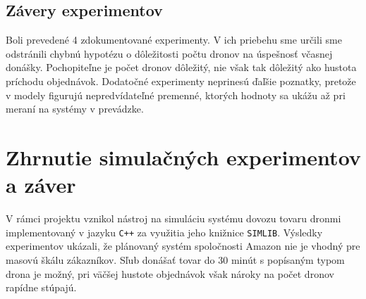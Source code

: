 \documentclass[czech, 12pt, a4paper]{article}
\begin{document}
\subsection{Závery experimentov}
Boli prevedené 4 zdokumentované experimenty. V ich priebehu sme určili sme odstránili chybnú hypotézu o dôležitosti počtu dronov na úspešnosť včasnej donášky. Pochopiteľne je počet dronov dôležitý, nie však tak dôležitý ako hustota príchodu objednávok. Dodatočné experimenty neprinesú ďaľšie poznatky, pretože v modely figurujú nepredvídateľné premenné, ktorých hodnoty sa ukážu až pri meraní na systémy v prevádzke.

\section{Zhrnutie simulačných experimentov a záver}
V rámci projektu vznikol nástroj na simuláciu systému dovozu tovaru dronmi implementovaný v jazyku \texttt{C++} za využitia jeho knižnice \texttt{SIMLIB}.
Výsledky experimentov ukázali, že plánovaný systém spoločnosti Amazon nie je vhodný pre masovú škálu zákazníkov. Sľub donášať tovar do 30 minút s popísaným typom drona je možný, pri väčšej hustote objednávok však nároky na počet dronov rapídne stúpajú.



\newpage

\nocite{*}

\end{document}
